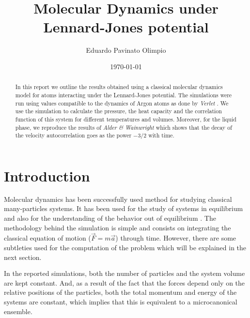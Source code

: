 \documentclass[aps,prl,reprint,groupedaddress]{revtex4-1}
\begin{document}
\title{Molecular Dynamics under Lennard-Jones potential}


\author{Eduardo Pavinato Olimpio}


\date{\today}

\begin{abstract}
	In this report we outline the results obtained using a classical molecular dynamics model for atoms interacting under the Lennard-Jones potential. The simulations were run using values compatible to the dynamics of Argon atoms as done by \textit{Verlet} \cite{Verlet1967}. We use the simulation to calculate the pressure, the heat capacity and the correlation function of this system for different temperatures and volumes. Moreover, for the liquid phase, we reproduce the results of \textit{Alder \& Wainwright} \cite{Alder1970} which shows that the decay of the velocity autocorrelation goes as the power $-3/2$ with time.
\end{abstract}

\maketitle

\section{Introduction}
Molecular dynamics has been successfully used method for studying classical many-particles systems. It has been used for the study of systems in equilibrium and also for the understanding of the behavior out of equilibrium \cite{RapaportBook}. The methodology behind the simulation is simple and consists on integrating the classical equation of motion ($\vec{F} = m\vec{a}$) through time. However, there are some subtleties used for the computation of the problem which will be explained in the next section.

In the reported simulations, both the number of particles and the system volume are kept constant. And, as a result of the fact that the forces depend only on the relative positions of the particles, both the total momentum and energy of the systems are  constant, which implies that this is equivalent to a microcanonical ensemble.
\end{document}
